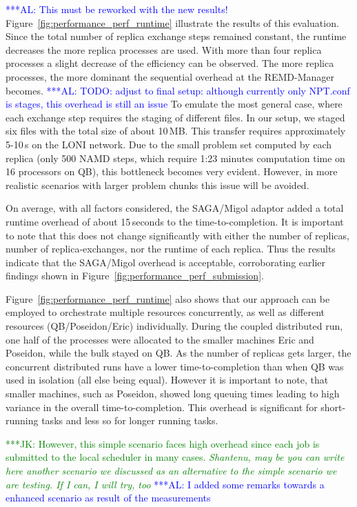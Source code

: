 \documentclass{rspublic}
\newcommand{\kimnote}[1]{ {\textcolor{green} { ***JK: #1 }}}
\newcommand{\alnote}[1]{ {\textcolor{blue} { ***AL: #1 }}}
\newcommand{\kimnote}[1]{}
\newcommand{\alnote}[1]{}
\begin{document}
\alnote{This must be reworked with the new results!}
Figure~\ref{fig:performance_perf_runtime} illustrate the results of
this evaluation. Since the total number of replica exchange steps
remained constant, the runtime decreases the more replica processes
are used.  With more than four replica processes a slight decrease of
the efficiency can be observed.
The more replica processes, the more dominant the sequential overhead
at the REMD-Manager becomes. 
\alnote{TODO: adjust to final setup: although currently only NPT.conf is
stages, this overhead is still an issue}
To emulate the most general case, where each exchange step requires the staging of
different files. In our setup, we staged six files with the total size
of about 10\,MB. This transfer requires approximately 5-10\,s
on the LONI network.  Due to the small problem set computed by each
replica (only 500 NAMD steps, which require 1:23 minutes computation
time on 16 processors on QB), this bottleneck becomes very evident. However, in more
realistic scenarios with larger problem chunks this issue will be
avoided.


On average, with all factors considered, the SAGA/Migol adaptor added
a total runtime overhead of about 15\,seconds to the
time-to-completion.  It is important to note that this does not change
significantly with either the number of replicas, number of
replica-exchanges, nor the runtime of each replica.  Thus the results
indicate that the SAGA/Migol overhead is acceptable, corroborating
earlier findings shown in
Figure~\ref{fig:performance_perf_submission}.

Figure~\ref{fig:performance_perf_runtime} also shows that our approach
can be employed to orchestrate multiple resources concurrently, as
well as different resources (QB/Poseidon/Eric) individually.  During
the coupled distributed run, one half of the processes were allocated to
the smaller machines Eric and Poseidon, while the bulk stayed on QB.  As the
number of replicas gets larger, the concurrent distributed runs have a
lower time-to-completion than when QB was used in isolation 
(all else being equal). However it is important to note, that
smaller machines, such as Poseidon, showed long queuing times leading
to high variance in the overall time-to-completion. This overhead is
significant for short-running tasks and less so for longer running
tasks. 

\kimnote{However, this simple scenario faces high overhead since each
  job is submitted to the local scheduler in many cases. \it Shantenu,
  may be you can write here another scenario we discussed as an
  alternative to the simple scenario we are testing.  If I can, I will
  try, too } \alnote{I added some remarks towards a enhanced scenario
  as result of the measurements}
  
\end{document}
